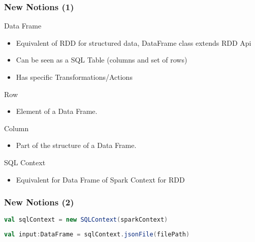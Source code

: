 \documentclass[slidetop,9pt,utf8]{beamer}
\begin{document}
\begin{CJK}{UTF8}{gbsn}
\begin{frame}
  \frametitle{New Notions (1)}

  \begin{block}{Data Frame}
    \begin{itemize}
      \item Equivalent of RDD for structured data, DataFrame class extends RDD Api
      \item Can be seen as a SQL Table (columns and set of rows)
      \item Has specific Transformations/Actions
    \end{itemize}
  \end{block}

  \begin{block}{Row}
    \begin{itemize}
      \item Element of a Data Frame.
    \end{itemize}
  \end{block}

  \begin{block}{Column}
    \begin{itemize}
      \item Part of the structure of a Data Frame.
    \end{itemize}
  \end{block}

  \begin{block}{SQL Context}
    \begin{itemize}
      \item Equivalent for Data Frame of Spark Context for RDD
    \end{itemize}
  \end{block}

\end{frame}

\begin{frame}[fragile]
  \frametitle{New Notions (2)}

  \begin{lstlisting}[label=SqlContextInitialization, caption=Init Spark SQL Context, language=scala, style=code]
val sqlContext = new SQLContext(sparkContext)
  \end{lstlisting}

  \begin{lstlisting}[label=JsonFileLoading, caption=Load a Data Frame from JSON file, language=scala, style=code]
val input:DataFrame = sqlContext.jsonFile(filePath)
  \end{lstlisting}


\end{frame}
\end{CJK}
\end{document}
